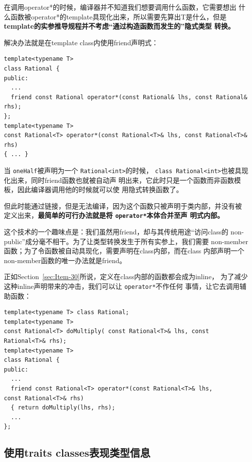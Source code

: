 \documentclass[a4paper,twoside]{article}
\theoremstyle{definition}
\theoremstyle{remark}
\numberwithin{equation}{section}
\let\OldTexttt\texttt
\renewcommand{\texttt}[1]{{\color{blue} \OldTexttt{#1}}}
\begin{document}
在调用operator*的时候，编译器并不知道我们想要调用什么函数，它需要想出
什么函数被operator*的template具现化出来，所以需要先算出T是什么，但是
\textbf{template的实参推导规程并不考虑“通过构造函数而发生的”隐式类型
  转换。}

解决办法就是在template class内使用friend声明式：

\begin{verbatim}
template<typename T>
class Rational {
public:
  ...
  friend const Rational operator*(const Rational& lhs, const Rational& rhs); 
};
template<typename T> 
const Rational<T> operator*(const Rational<T>& lhs, const Rational<T>& rhs)
{ ... }
\end{verbatim}

当\texttt{oneHalf}被声明为一个\texttt{Rational<int>}的时候，
\texttt{class Rational<int>}也被具现化出来，同时friend函数也就被自动声
明出来，它此时只是一个函数而非函数模板，因此编译器调用他的时候就可以使
用隐式转换函数了。

但此时能通过链接，但是无法编译，因为这个函数只被声明于类内部，并没有被
定义出来，\textbf{最简单的可行办法就是将\texttt{operator*}本体合并至声
  明式内部。}

这个技术的一个趣味点是：我们虽然用friend，却与其传统用途“访问class的
non-public”成分毫不相干。为了让类型转换发生于所有实参上，我们需要
non-member函数；为了令函数被自动具现化，需要声明在class内部，而在class
内部声明一个non-member函数的唯一办法就是friend。

正如Section~\ref{sec:Item-30}所说，定义在class内部的函数都会成为inline，
为了减少这种inline声明带来的冲击，我们可以让\texttt{operator*}不作任何
事情，让它去调用辅助函数：
\begin{verbatim}
template<typename T> class Rational;
template<typename T> 
const Rational<T> doMultiply( const Rational<T>& lhs, const
Rational<T>& rhs);
template<typename T>
class Rational {
public:
  ...
  friend const Rational<T> operator*(const Rational<T>& lhs,
const Rational<T>& rhs)
  { return doMultiply(lhs, rhs);
  ...
};
\end{verbatim}

\subsection{使用traits classes表现类型信息}
\label{sec:Item-47}
\end{document}
